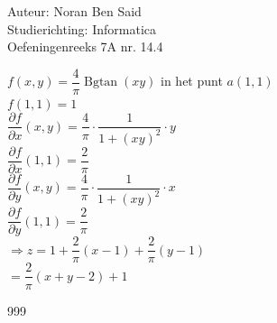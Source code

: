 \documentclass[a4paper]{article}
\begin{document}
  
\noindent \large Auteur: Noran Ben Said \\
\noindent \large Studierichting: Informatica\\
\noindent \large Oefeningenreeks 7A nr. 14.4\\

\medskip

\normalsize

$f(x,y) = \dfrac{4}{\pi} \operatorname{Bgtan}(xy)$ in het punt $a(1,1)$ \\

$f(1,1) = 1$ \\

$\dfrac{\partial f}{\partial x}(x, y) = \dfrac{4}{\pi} \cdot \dfrac{1}{1 + (xy)^2} \cdot y$ \\

$\dfrac{\partial f}{\partial x}(1,1) = \dfrac{2}{\pi}$ \\

$\dfrac{\partial f}{\partial y}(x, y) = \dfrac{4}{\pi} \cdot \dfrac{1}{1 + (xy)^2} \cdot x$ \\

$\dfrac{\partial f}{\partial y}(1,1) = \dfrac{2}{\pi}$ \\

$\Rightarrow z = 1 + \dfrac{2}{\pi}(x - 1) + \dfrac{2}{\pi}(y - 1)$ \\

$= \dfrac{2}{\pi}(x + y - 2) + 1$ \\


\begin{thebibliography}{999}
\end{thebibliography}
\end{document}
